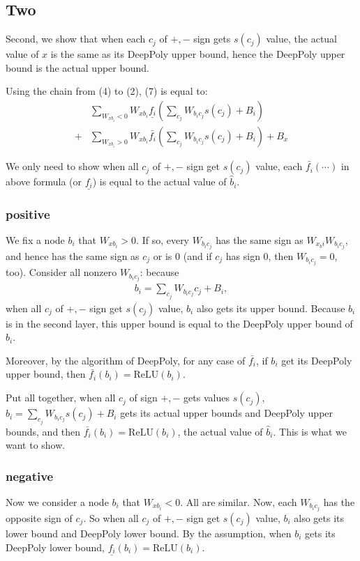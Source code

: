 \documentclass[]{article}
\theoremstyle{definition}
\newcommand{\ReLU}{\mathrm{ReLU}}
\begin{document}
\subsection*{Two} Second, we show that when each $c_j$ of $+,-$ sign gets $s(c_j)$ value, the actual value of $x$ is the same as its DeepPoly upper bound, hence the DeepPoly upper bound is the actual upper bound.

Using the chain from (4) to (2), (7) is equal to: \begin{align*}
&\sum_{W_{xb_i}<0}W_{xb_i}\underline{f_i}(\sum_{c_j}W_{b_ic_j}s(c_j)+B_i)\\
+&\sum_{W_{xb_i}>0}W_{xb_i}\bar{f_i}(\sum_{c_j}W_{b_ic_j}s(c_j)+B_i)+B_x
\end{align*} 

We only need to show when all $c_j$ of $+,-$ sign get $s(c_j)$ value, each $\bar{f_i}(\cdots)$ in above formula (or $\underline{f_i}$) is equal to the actual value of $\hat{b}_i$. 

\subsubsection*{positive} We fix a node $b_i$ that $W_{xb_i}>0$. If so, every $W_{b_ic_j}$ has the same sign as $W_{x_bi}W_{b_ic_j}$, and hence has the same sign as $c_j$ or is $0$ (and if $c_j$ has sign $0$, then $W_{b_ic_j}=0$, too). Consider all nonzero $W_{b_ic_j}$: because \begin{align}
	b_i = \sum_{c_j} W_{b_ic_j}c_j+B_i,
\end{align}  when all $c_j$ of $+,-$ sign get $s(c_j)$ value, $b_i$ also gets its upper bound. Because $b_i$ is in the second layer, this upper bound is equal to the DeepPoly upper bound of $b_i$. 


Moreover, by the algorithm of DeepPoly, for any case of $\bar{f_i}$, if $b_i$ get its DeepPoly upper bound, then $\bar{f_i}(b_i)=\ReLU(b_i)$. 

Put all together, when all $c_j$ of sign $+,-$ gets values $s(c_j)$, $b_i=\sum_{c_j}W_{b_ic_j}s(c_j)+B_i$ gets its actual upper bounds and DeepPoly upper bounds, and then  $\bar{f_i}(b_i)=\ReLU(b_i)$, the actual value of $\hat{b}_i$. This is what we want to show.


\subsubsection*{negative}Now we consider a node $b_i$ that $W_{xb_i}<0$. All are similar. Now, each $W_{b_ic_j}$ has the opposite sign of $c_j$. So when all $c_j$ of $+,-$ sign get $s(c_j)$ value, $b_i$ also gets its lower bound and DeepPoly lower bound. By the assumption, when $b_i$ gets its DeepPoly lower bound, $\underline{f_i}(b_i)=\ReLU(b_i)$.
\end{document}
